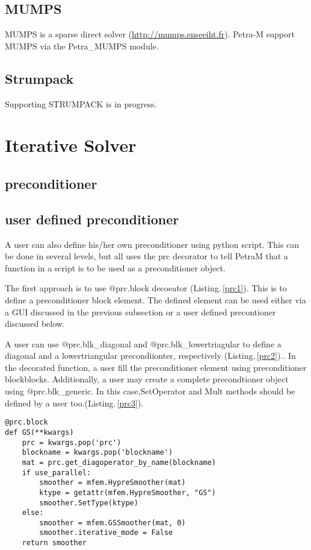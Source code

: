 \documentclass[11pt,a4paper,draft]{report}
\begin{document}
\subsection{MUMPS}
MUMPS is a sparse direct solver (\url{http://mumps.enseeiht.fr}). Petra-M support MUMPS via the Petra\_MUMPS module. 
\subsection{Strumpack}
Supporting STRUMPACK is in progress.
\section{Iterative Solver}
\subsection{preconditioner}


\subsection{user defined preconditioner}
A user can also define his/her own preconditioner using python script.  This can be done in several levels, but all
uses the prc decorator to tell PetraM that a function in a script is to be used as a preconditioner object.

The first approach is to use $@$prc.block decoeator (Listing.\,\ref{prc1}). This is to define a preconditioner block element.  The defined element can be used either via a GUI discussed in the previous subsection or a user defined precontioner discussed below.  


A user can use $@$prc.blk\_diagonal and $@$prc.blk\_lowertriagular to define a diagonal and a lowertriangular precondiionter, respectively (Listing.\,\ref{prc2}).. In the decorated function, a user fill the preconditioner element using preconditioner blockblocks. Additionally, a user may create a complete precondtioner object using $@$prc.blk\_generic. In this case,SetOperator and Mult methods should be defined  by a user too.(Listing.\,\ref{prc3}). 

\begin{minipage}[c]{0.95\textwidth}
\begin{lstlisting}[caption={A user defined preconditioner block},captionpos=b, frame=single, label={prc1}]
@prc.block
def GS(**kwargs)
    prc = kwargs.pop('prc')
    blockname = kwargs.pop('blockname')
    mat = prc.get_diagoperator_by_name(blockname)
    if use_parallel:
        smoother = mfem.HypreSmoother(mat)
        ktype = getattr(mfem.HypreSmoother, "GS")
        smoother.SetType(ktype)
    else:
        smoother = mfem.GSSmoother(mat, 0)
        smoother.iterative_mode = False
    return smoother
\end{lstlisting}
\end{minipage}
\end{document}
